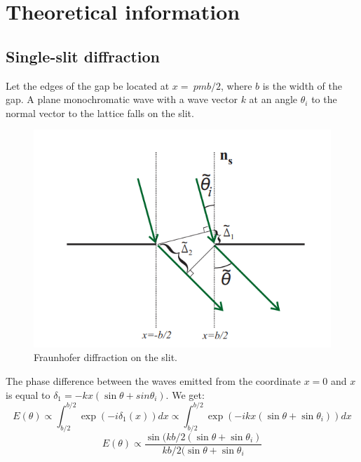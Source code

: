 \documentclass[a4paper, 12pt]{article}
\begin{document}
	\section*{Theoretical information}
	\subsection*{Single-slit diffraction}
	Let the edges of the gap be located at $x = \ pm b / 2$, where $b$ is the width of the gap. A plane monochromatic wave with a wave vector $k$ at an angle $\theta_i$ to the normal vector to the lattice falls on the slit.
	\begin{figure}[H]
		\centering
		\includegraphics[width=0.85\linewidth]{diff1.png}
		\caption{Fraunhofer diffraction on the slit.}
		\label{fig:1}
	\end{figure}
	The phase difference between the waves emitted from the coordinate $x = 0$ and $x$ is equal to $ \delta_1 = - k x (\sin {\theta} + sin {\theta_i})$. We get:
	\begin{equation}
		E(\theta) \propto \int_{b/2}^{b/2}{\exp(-i \delta_1(x))dx} \propto \int_{b/2}^{b/2}{\exp(-i k x (\sin{\theta} + \sin{\theta_i})) dx}
	\end{equation}
	\begin{equation}
		E(\theta) \propto \frac{\sin(k b / 2 (\sin{\theta} + \sin{\theta_i})}{k b / 2 (\sin{\theta} + \sin{\theta_i}}
	\end{equation}
\end{document}
